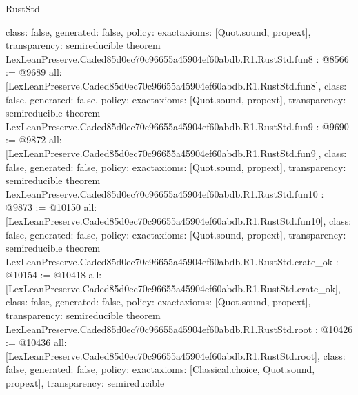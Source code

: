 \begin{lexlean}{RustStd}
\begin{coremodule}
{  class: false,
  generated: false,
  policy: exact{axioms: [Quot.sound, propext]},
  transparency: semireducible
}
theorem LexLeanPreserve.Caded85d0ec70c96655a45904ef60abdb.R1.RustStd.fun8 : @8566 := @9689 {
  all: [LexLeanPreserve.Caded85d0ec70c96655a45904ef60abdb.R1.RustStd.fun8],
  class: false,
  generated: false,
  policy: exact{axioms: [Quot.sound, propext]},
  transparency: semireducible
}
theorem LexLeanPreserve.Caded85d0ec70c96655a45904ef60abdb.R1.RustStd.fun9 : @9690 := @9872 {
  all: [LexLeanPreserve.Caded85d0ec70c96655a45904ef60abdb.R1.RustStd.fun9],
  class: false,
  generated: false,
  policy: exact{axioms: [Quot.sound, propext]},
  transparency: semireducible
}
theorem LexLeanPreserve.Caded85d0ec70c96655a45904ef60abdb.R1.RustStd.fun10 : @9873 := @10150 {
  all: [LexLeanPreserve.Caded85d0ec70c96655a45904ef60abdb.R1.RustStd.fun10],
  class: false,
  generated: false,
  policy: exact{axioms: [Quot.sound, propext]},
  transparency: semireducible
}
theorem LexLeanPreserve.Caded85d0ec70c96655a45904ef60abdb.R1.RustStd.crate_ok : @10154 := @10418 {
  all: [LexLeanPreserve.Caded85d0ec70c96655a45904ef60abdb.R1.RustStd.crate_ok],
  class: false,
  generated: false,
  policy: exact{axioms: [Quot.sound, propext]},
  transparency: semireducible
}
theorem LexLeanPreserve.Caded85d0ec70c96655a45904ef60abdb.R1.RustStd.root : @10426 := @10436 {
  all: [LexLeanPreserve.Caded85d0ec70c96655a45904ef60abdb.R1.RustStd.root],
  class: false,
  generated: false,
  policy: exact{axioms: [Classical.choice, Quot.sound, propext]},
  transparency: semireducible
}


\end{coremodule}
\end{lexlean}
